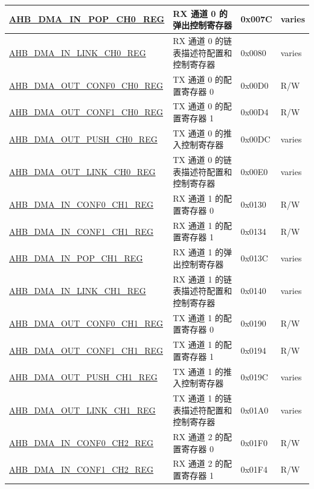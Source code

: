 \begin{longtable}{ | l | l | p{1.3cm} | l | }
\hyperref[regdesc:AHBDMAINPOPCHNREG]{AHB\_DMA\_IN\_POP\_CH0\_REG} & RX 通道 0 的弹出控制寄存器 & 0x007C & varies \\ \hline
\hyperref[regdesc:AHBDMAINLINKCHNREG]{AHB\_DMA\_IN\_LINK\_CH0\_REG} & RX 通道 0 的链表描述符配置和控制寄存器 & 0x0080 & varies \\ \hline
\hyperref[regdesc:AHBDMAOUTCONF0CHNREG]{AHB\_DMA\_OUT\_CONF0\_CH0\_REG} & TX 通道 0 的配置寄存器 0 & 0x00D0 & R/W \\ \hline
\hyperref[regdesc:AHBDMAOUTCONF1CHNREG]{AHB\_DMA\_OUT\_CONF1\_CH0\_REG} & TX 通道 0 的配置寄存器 1 & 0x00D4 & R/W \\ \hline
\hyperref[regdesc:AHBDMAOUTPUSHCHNREG]{AHB\_DMA\_OUT\_PUSH\_CH0\_REG} & TX 通道 0 的推入控制寄存器 & 0x00DC & varies \\ \hline
\hyperref[regdesc:AHBDMAOUTLINKCHNREG]{AHB\_DMA\_OUT\_LINK\_CH0\_REG} & TX 通道 0 的链表描述符配置和控制寄存器 & 0x00E0 & varies \\ \hline
\hyperref[regdesc:AHBDMAINCONF0CHNREG]{AHB\_DMA\_IN\_CONF0\_CH1\_REG} & RX 通道 1 的配置寄存器 0 & 0x0130 & R/W \\ \hline
\hyperref[regdesc:AHBDMAINCONF1CHNREG]{AHB\_DMA\_IN\_CONF1\_CH1\_REG} & RX 通道 1 的配置寄存器 1 & 0x0134 & R/W \\ \hline
\hyperref[regdesc:AHBDMAINPOPCHNREG]{AHB\_DMA\_IN\_POP\_CH1\_REG} & RX 通道 1 的弹出控制寄存器 & 0x013C & varies \\ \hline
\hyperref[regdesc:AHBDMAINLINKCHNREG]{AHB\_DMA\_IN\_LINK\_CH1\_REG} & RX 通道 1 的链表描述符配置和控制寄存器 & 0x0140 & varies \\ \hline
\hyperref[regdesc:AHBDMAOUTCONF0CHNREG]{AHB\_DMA\_OUT\_CONF0\_CH1\_REG} & TX 通道 1 的配置寄存器 0 & 0x0190 & R/W \\ \hline
\hyperref[regdesc:AHBDMAOUTCONF1CHNREG]{AHB\_DMA\_OUT\_CONF1\_CH1\_REG} & TX 通道 1 的配置寄存器 1 & 0x0194 & R/W \\ \hline
\hyperref[regdesc:AHBDMAOUTPUSHCHNREG]{AHB\_DMA\_OUT\_PUSH\_CH1\_REG} & TX 通道 1 的推入控制寄存器 & 0x019C & varies \\ \hline
\hyperref[regdesc:AHBDMAOUTLINKCHNREG]{AHB\_DMA\_OUT\_LINK\_CH1\_REG} & TX 通道 1 的链表描述符配置和控制寄存器 & 0x01A0 & varies \\ \hline
\hyperref[regdesc:AHBDMAINCONF0CHNREG]{AHB\_DMA\_IN\_CONF0\_CH2\_REG} & RX 通道 2 的配置寄存器 0 & 0x01F0 & R/W \\ \hline
\hyperref[regdesc:AHBDMAINCONF1CHNREG]{AHB\_DMA\_IN\_CONF1\_CH2\_REG} & RX 通道 2 的配置寄存器 1 & 0x01F4 & R/W \\ \hline

\end{longtable}
